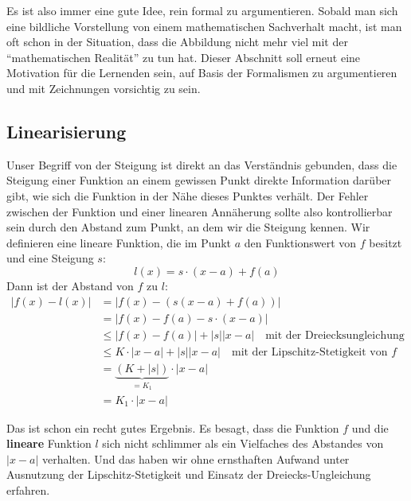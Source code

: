 Es ist also immer eine gute Idee, rein formal zu argumentieren. Sobald man sich eine bildliche Vorstellung von einem mathematischen Sachverhalt macht, ist man oft schon in der Situation, dass die Abbildung nicht mehr viel mit der "`mathematischen Realität"' zu tun hat. Dieser Abschnitt soll erneut eine Motivation für die Lernenden sein, auf Basis der Formalismen zu argumentieren und mit Zeichnungen vorsichtig zu sein.

\subsection{Linearisierung}

Unser Begriff von der Steigung ist direkt an das Verständnis gebunden, dass die Steigung einer Funktion an einem gewissen Punkt direkte Information darüber gibt, wie sich die Funktion in der Nähe dieses Punktes verhält. Der Fehler zwischen der Funktion und einer linearen Annäherung sollte also kontrollierbar sein durch den Abstand zum Punkt, an dem wir die Steigung kennen. Wir definieren eine lineare Funktion, die im Punkt $a$ den Funktionswert von $f$ besitzt und eine Steigung $s$:
\[
l(x) = s\cdot (x-a)+f(a)
\]
Dann ist der Abstand von $f$ zu $l$:
\begin{equation}\label{eq:lin}
\begin{split}
|f(x)-l(x)| &= |f(x)-(s(x-a)+f(a))| \\
&= |f(x)-f(a) -s\cdot (x-a)| \\
&\le |f(x)-f(a)| + |s||x-a| \quad \text{mit der Dreiecksungleichung} \\
&\le K\cdot |x-a| + |s||x-a| \quad \text{mit der Lipschitz-Stetigkeit von }f \\
&= \underbrace{(K+|s|)}_{=K_1}\cdot |x-a| \\
&= K_1\cdot |x-a|
\end{split}
\end{equation}

Das ist schon ein recht gutes Ergebnis. Es besagt, dass die Funktion $f$ und die \textbf{lineare} Funktion $l$ sich nicht schlimmer als ein Vielfaches des Abstandes von $|x-a|$ verhalten. Und das haben wir ohne ernsthaften Aufwand unter Ausnutzung der Lipschitz-Stetigkeit und Einsatz der Dreiecks-Ungleichung erfahren.

